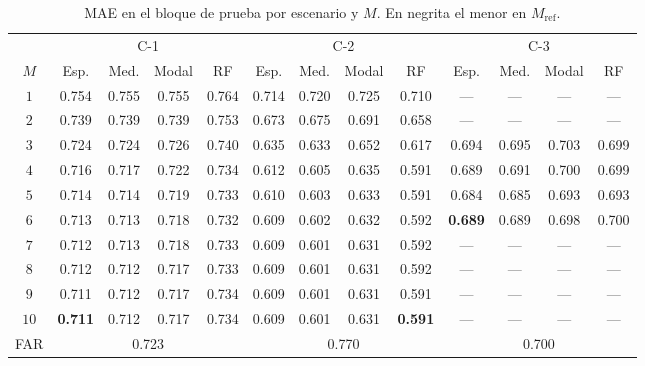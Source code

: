 \begin{table}[H]
\centering\small
\setlength{\tabcolsep}{3.5pt}
\caption{MAE en el bloque de prueba por escenario y $M$. En negrita el menor en $M_{\mathrm{ref}}$.}
\label{tab:res_bloqueA}
\begin{tabular}{c cccc cccc cccc}
\hline
 & \multicolumn{4}{c}{C-1} & \multicolumn{4}{c}{C-2} & \multicolumn{4}{c}{C-3} \\
$M$ & Esp. & Med. & Modal & RF & Esp. & Med. & Modal & RF & Esp. & Med. & Modal & RF \\
\hline
$1$  & 0.754 & 0.755 & 0.755 & 0.764 & 0.714 & 0.720 & 0.725 & 0.710 & --- & --- & --- & --- \\
$2$  & 0.739 & 0.739 & 0.739 & 0.753 & 0.673 & 0.675 & 0.691 & 0.658 & --- & --- & --- & --- \\
$3$  & 0.724 & 0.724 & 0.726 & 0.740 & 0.635 & 0.633 & 0.652 & 0.617 & 0.694 & 0.695 & 0.703 & 0.699 \\
$4$  & 0.716 & 0.717 & 0.722 & 0.734 & 0.612 & 0.605 & 0.635 & 0.591 & 0.689 & 0.691 & 0.700 & 0.699 \\
$5$  & 0.714 & 0.714 & 0.719 & 0.733 & 0.610 & 0.603 & 0.633 & 0.591 & 0.684 & 0.685 & 0.693 & 0.693 \\
$6$  & 0.713 & 0.713 & 0.718 & 0.732 & 0.609 & 0.602 & 0.632 & 0.592 & \textbf{0.689} & 0.689 & 0.698 & 0.700 \\
$7$  & 0.712 & 0.713 & 0.718 & 0.733 & 0.609 & 0.601 & 0.631 & 0.592 & --- & --- & --- & --- \\
$8$  & 0.712 & 0.712 & 0.717 & 0.733 & 0.609 & 0.601 & 0.631 & 0.592 & --- & --- & --- & --- \\
$9$  & 0.711 & 0.712 & 0.717 & 0.734 & 0.609 & 0.601 & 0.631 & 0.591 & --- & --- & --- & --- \\
$10$ & \textbf{0.711} & 0.712 & 0.717 & 0.734 & 0.609 & 0.601 & 0.631 & \textbf{0.591} & --- & --- & --- & --- \\
\hline
FAR & \multicolumn{4}{c}{0.723} & \multicolumn{4}{c}{0.770} & \multicolumn{4}{c}{0.700} \\
\hline
\end{tabular}
\end{table}

